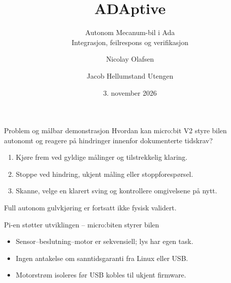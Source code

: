 \documentclass[aspectratio=169,11pt]{beamer}
\title{ADAptive}
\subtitle{Autonom Mecanum-bil i Ada\\Integrasjon, feilrespons og verifikasjon}
\author{Nicolay Olafsen \and Jacob Hellumstand Utengen}
\institute{VE3140 -- Intelligente sanntidssystemer, USN}
\date{3. november 2026}
\begin{document}
\begin{frame}
\titlepage
\end{frame}

\begin{frame}{Problem og målbar demonstrasjon}
Hvordan kan micro:bit V2 styre bilen autonomt og reagere på hindringer
innenfor dokumenterte tidskrav?
\vspace{6mm}
\begin{enumerate}
\item Kjøre frem ved gyldige målinger og tilstrekkelig klaring.
\item Stoppe ved hindring, ukjent måling eller stoppforespørsel.
\item Skanne, velge en klarert sving og kontrollere omgivelsene på nytt.
\end{enumerate}
\vspace{5mm}
\alert{Full autonom gulvkjøring er fortsatt ikke fysisk validert.}
\end{frame}

\begin{frame}{Pi-en støtter utviklingen -- micro:biten styrer bilen}
\centering
{}
\vspace{5mm}
\begin{itemize}
\item Sensor--beslutning--motor er sekvensiell; lys har egen task.
\item Ingen antakelse om sanntidsgaranti fra Linux eller USB.
\item Motorstrøm isoleres før USB kobles til ukjent firmware.
\end{itemize}
\end{frame}
\end{document}
